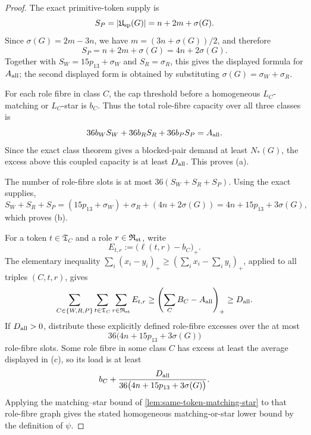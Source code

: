 \documentclass[11pt]{article}
\begin{document}
\begin{proof}
The exact primitive-token supply is
\[
S_P=|\mathfrak U_{\rm sp}(G)|=n+2m+\sigma(G).
\]
Since \(\sigma(G)=2m-3n\), we have \(m=(3n+\sigma(G))/2\), and therefore
\[
S_P=n+2m+\sigma(G)=4n+2\sigma(G).
\]
Together with \(S_W=15p_{13}+\sigma_W\) and \(S_R=\sigma_R\), this gives the
displayed formula for \(A_{\rm all}\); the second displayed form is obtained by
substituting \(\sigma(G)=\sigma_W+\sigma_R\).

For each role fibre in class \(C\), the cap threshold before a homogeneous
\(L_C\)-matching or \(L_C\)-star is \(b_C\).  Thus the total role-fibre
capacity over all three classes is
\[
36b_WS_W+36b_RS_R+36b_PS_P=A_{\rm all}.
\]
Since the exact class theorem gives a blocked-pair demand at least \(N_*(G)\),
the excess above this coupled capacity is at least \(D_{\rm all}\).  This proves
(a).

The number of role-fibre slots is at most \(36(S_W+S_R+S_P)\).  Using the exact
supplies,
\[
S_W+S_R+S_P
=(15p_{13}+\sigma_W)+\sigma_R+(4n+2\sigma(G))
=4n+15p_{13}+3\sigma(G),
\]
which proves (b).

For a token \(t\in\mathfrak T_C\) and a role \(r\in\mathfrak R_{\rm st}\),
write
\[
E_{t,r}:=\bigl(\ell(t,r)-b_C\bigr)_+ .
\]
The elementary inequality \(\sum_i(x_i-y_i)_+\ge(\sum_i x_i-\sum_i y_i)_+\),
applied to all triples \((C,t,r)\), gives
\[
\sum_{C\in\{W,R,P\}}\sum_{t\in\mathfrak T_C}
\sum_{r\in\mathfrak R_{\rm st}}E_{t,r}
\ge
\left(
\sum_C B_C-A_{\rm all}
\right)_+
\ge D_{\rm all}.
\]
If \(D_{\rm all}>0\), distribute these explicitly defined role-fibre excesses
over the at most
\[
36\bigl(4n+15p_{13}+3\sigma(G)\bigr)
\]
role-fibre slots.  Some role fibre in some class \(C\) has excess at least the
average displayed in (c), so its load is at least
\[
b_C+
\frac{D_{\rm all}}
{36\bigl(4n+15p_{13}+3\sigma(G)\bigr)}.
\]
Applying the matching--star bound of \cref{lem:same-token-matching-star} to
that role-fibre graph gives the stated homogeneous matching-or-star lower
bound by the definition of \(\psi\).
\end{proof}
\end{document}
